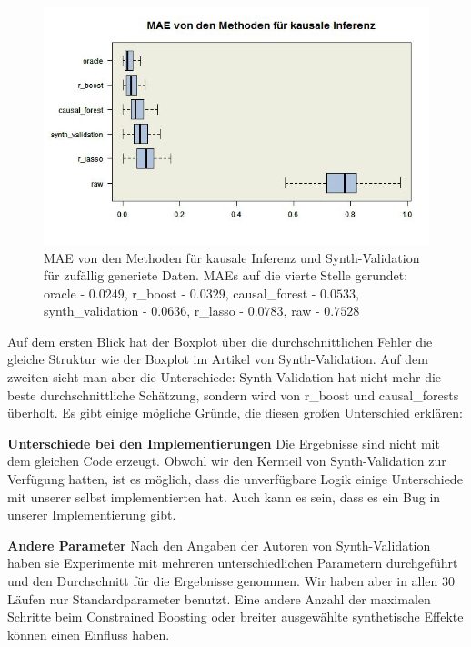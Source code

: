 \documentclass[12pt,a4paper,twoside]{scrartcl}
\numberwithin{equation}{section}
\begin{document}
\begin{center}
\begin{figure}[h]
    \centering
    \includegraphics[height=0.5\textwidth, width=1\textwidth]{figures/plots/randomBoxplot.jpeg}
    \caption[MAE von den Methoden für kausale Inferenz und Synth-Validation für zufällig generiete Daten]{MAE von den Methoden für kausale Inferenz und Synth-Validation für zufällig generiete Daten. MAEs auf die vierte Stelle gerundet: oracle - $0.0249$, r\_boost - $0.0329$, causal\_forest - $0.0533$, synth\_validation - $0.0636$, r\_lasso - $0.0783$, raw - $0.7528$}\label{fig:randomBoxplot}
  \end{figure}
\end{center}

\noindent
Auf dem ersten Blick hat der Boxplot über die durchschnittlichen Fehler die gleiche Struktur wie der Boxplot im Artikel von Synth-Validation\cite{schuler2017synth}. Auf dem zweiten sieht man aber die Unterschiede: Synth-Validation hat nicht mehr die beste durchschnittliche Schätzung, sondern wird von r\_boost und causal\_forests überholt. Es gibt einige mögliche Gründe, die diesen großen  Unterschied erklären: \par

\noindent
\textbf{Unterschiede bei den Implementierungen} Die Ergebnisse sind nicht mit dem gleichen Code erzeugt. Obwohl wir den Kernteil von Synth-Validation zur Verfügung hatten, ist es möglich, dass die unverfügbare Logik einige Unterschiede mit unserer selbst implementierten hat. Auch kann es sein, dass es ein Bug in unserer Implementierung gibt.
\par

\noindent
\textbf{Andere Parameter} Nach den Angaben der Autoren von Synth-Validation haben sie Experimente mit mehreren unterschiedlichen Parametern durchgeführt und den Durchschnitt für die Ergebnisse genommen\cite{schuler2017synth}. Wir haben aber in allen 30 Läufen nur Standardparameter benutzt. Eine andere Anzahl der maximalen Schritte beim Constrained Boosting oder breiter ausgewählte synthetische Effekte können einen Einfluss haben.  
\par
\end{document}
